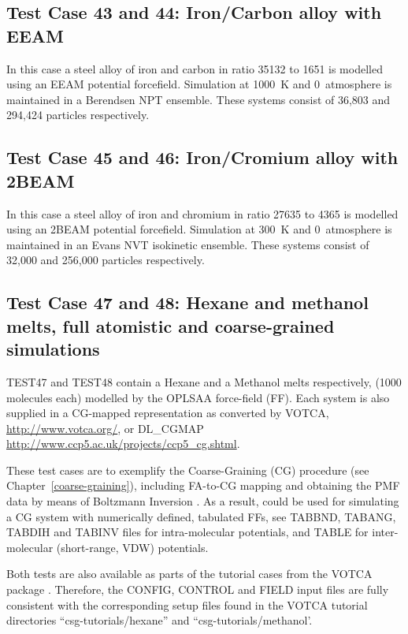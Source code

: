 \subsection{Test Case 43 and 44: Iron/Carbon alloy with EEAM}

In this case a steel alloy of iron and carbon in ratio
35132 to 1651 is modelled using an EEAM potential forcefield.
Simulation at 1000~K and 0~atmosphere is maintained in a Berendsen NPT
ensemble.  These systems consist of 36,803 and 294,424
particles respectively.

\subsection{Test Case 45 and 46: Iron/Cromium alloy with 2BEAM}

In this case a steel alloy of iron and chromium in ratio
27635 to 4365 is modelled using an 2BEAM potential forcefield.
Simulation at 300~K and 0~atmosphere is maintained in an Evans NVT
isokinetic ensemble.  These systems consist of 32,000 and 256,000
particles respectively.

\subsection{Test Case 47 and 48: Hexane and methanol melts,
full atomistic and coarse-grained simulations}

TEST47 and TEST48 contain a Hexane and a Methanol melts respectively,
(1000 molecules each) modelled by the OPLSAA force-field (FF).
Each system is also supplied in a CG-mapped representation as converted
by VOTCA, \href{http://www.votca.org/}{http://www.votca.org/},
or DL\_CGMAP \href{http://www.ccp5.ac.uk/projects/ccp5\_cg.shtml}{http://www.ccp5.ac.uk/projects/ccp5\_cg.shtml}.

These test cases are to exemplify the Coarse-Graining (CG) procedure
(see Chapter~\ref{coarse-graining}), including FA-to-CG mapping and
obtaining the PMF data by means of Boltzmann Inversion \cite{reith-03a}.
As a result, \D could be used for simulating a CG system with numerically
defined, tabulated FFs, see TABBND, TABANG, TABDIH and TABINV files for
intra-molecular potentials, and TABLE for inter-molecular (short-range, VDW)
potentials.

Both tests are also available as parts of the tutorial cases from the
VOTCA package \cite{ruhle-09a}.  Therefore, the CONFIG, CONTROL and FIELD
input files are fully consistent with the corresponding setup files found
in the VOTCA tutorial directories ``csg-tutorials/hexane'' and ``csg-tutorials/methanol'.

